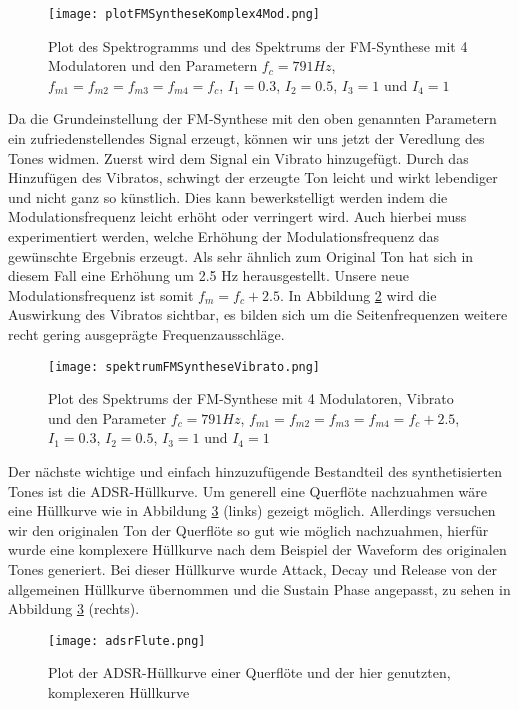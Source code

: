 \begin{figure} [ht]
\centering
  \texttt{[image: plotFMSyntheseKomplex4Mod.png]}
\caption{Plot des Spektrogramms und des Spektrums der FM-Synthese mit 4 Modulatoren und den Parametern $f_c = 791 Hz$, $f_{m1} = f_{m2} = f_{m3} = f_{m4} = f_c$, $I_1 = 0.3$, $I_2 = 0.5$, $I_3 = 1$ und $I_4 = 1$}
\label{fig:plotFMSyntheseKomplex4Mod}
\end{figure}

Da die Grundeinstellung der FM-Synthese mit den oben genannten Parametern ein zufriedenstellendes Signal erzeugt, können wir uns jetzt der Veredlung des Tones widmen. Zuerst wird dem Signal ein Vibrato hinzugefügt. Durch das Hinzufügen des Vibratos, schwingt der erzeugte Ton leicht und wirkt lebendiger und nicht ganz so künstlich. Dies kann bewerkstelligt werden indem die Modulationsfrequenz leicht erhöht oder verringert wird. Auch hierbei muss experimentiert werden, welche Erhöhung der Modulationsfrequenz das gewünschte Ergebnis erzeugt. Als sehr ähnlich zum Original Ton hat sich in diesem Fall eine Erhöhung um 2.5 Hz herausgestellt. Unsere neue Modulationsfrequenz ist somit $f_m = f_c + 2.5$. In Abbildung \ref{fig:spektrumFMSyntheseVibrato} wird die Auswirkung des Vibratos sichtbar, es bilden sich um die Seitenfrequenzen weitere recht gering ausgeprägte Frequenzausschläge.

\begin{figure} [ht]
\centering
  \texttt{[image: spektrumFMSyntheseVibrato.png]}
\caption{Plot des Spektrums der FM-Synthese mit 4 Modulatoren, Vibrato und den Parameter $f_c = 791 Hz$, $f_{m1} = f_{m2} = f_{m3} = f_{m4} = f_c + 2.5$, $I_1 = 0.3$, $I_2 = 0.5$, $I_3 = 1$ und $I_4 = 1$}
\label{fig:spektrumFMSyntheseVibrato}
\end{figure}

Der nächste wichtige und einfach hinzuzufügende Bestandteil des synthetisierten Tones ist die ADSR-Hüllkurve. Um generell eine Querflöte nachzuahmen wäre eine Hüllkurve wie in Abbildung \ref{fig:adsrFlute} (links) gezeigt möglich. Allerdings versuchen wir den originalen Ton der Querflöte so gut wie möglich nachzuahmen, hierfür wurde eine komplexere Hüllkurve nach dem Beispiel der Waveform des originalen Tones generiert. Bei dieser Hüllkurve wurde Attack, Decay und Release von der allgemeinen Hüllkurve übernommen und die Sustain Phase angepasst, zu sehen in Abbildung \ref{fig:adsrFlute} (rechts). 

\begin{figure} [ht]
\centering
  \texttt{[image: adsrFlute.png]}
\caption{Plot der ADSR-Hüllkurve einer Querflöte und der hier genutzten, komplexeren Hüllkurve}
\label{fig:adsrFlute}
\end{figure}


